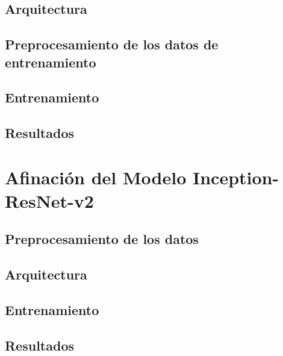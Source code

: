 \subsection{Arquitectura}


\subsection{Preprocesamiento de los datos de entrenamiento}


\subsection{Entrenamiento}

\subsection{Resultados}



\cite{Inception-v3}




\section{Afinación del Modelo Inception-ResNet-v2}

\cite{Inception-ResNet}

\subsection{Preprocesamiento de los datos}

\subsection{Arquitectura}

\subsection{Entrenamiento}

\subsection{Resultados}








